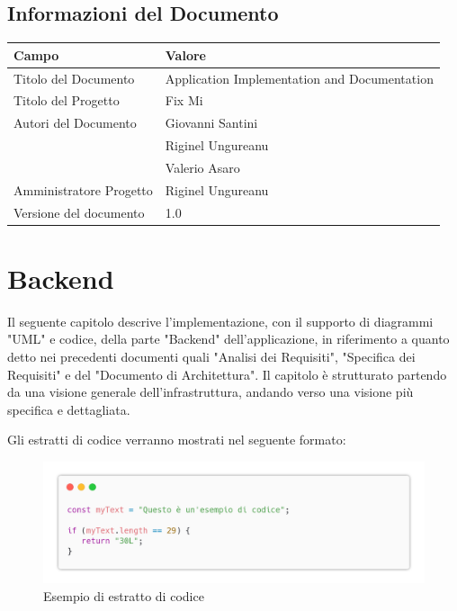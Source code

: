 \documentclass{report}
\begin{document}
\section{Informazioni del Documento}

\begin{center} %
	\centering
	\begin{tabular}{ |p{4cm}|p{4cm}|  }
		\hline
		\centering Campo        & \qquad\qquad Valore                          \\ %
		\hline
		Titolo del Documento    & Application Implementation and Documentation \\
		\hline
		Titolo del Progetto     & Fix Mi                                       \\
		\hline
		Autori del Documento    &
		Giovanni Santini                                                       \\ & Riginel Ungureanu \\ & Valerio Asaro \\
		\hline
		Amministratore Progetto & Riginel Ungureanu                            \\
		\hline
		Versione del documento  & 1.0                                          \\
		\hline
	\end{tabular}
\end{center}



\chapter{Backend}

Il seguente capitolo descrive l'implementazione, con il supporto di diagrammi "UML" e codice, della parte "Backend" dell'applicazione, in riferimento a quanto detto nei precedenti documenti quali "Analisi dei Requisiti", "Specifica dei Requisiti" e del "Documento di Architettura".  Il capitolo è strutturato partendo da una visione generale dell'infrastruttura, andando verso una visione più specifica e dettagliata.


Gli estratti di codice verranno mostrati nel seguente formato:
\begin{figure}[H]
	\centering\includegraphics[width=1\textwidth]{images/example_code_01.png}
	Esempio di estratto di codice
\end{figure}
\end{document}
